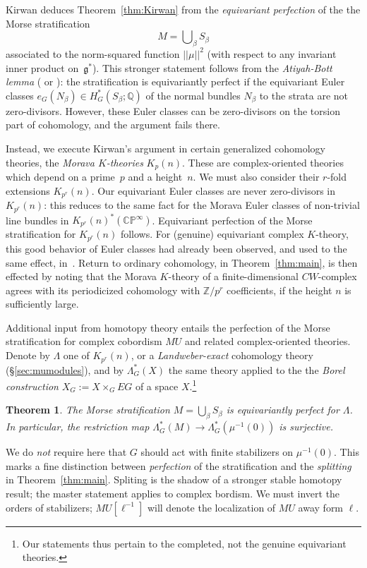 \documentclass[11pt, reqno]{amsart}
\theoremstyle{plain}
\newtheorem{thm}{Theorem}[section]
\theoremstyle{definition}
\newcommand{\landw}{\Lambda}
\begin{document}
Kirwan deduces Theorem~\ref{thm:Kirwan} from the \emph{equivariant perfection} of the the Morse stratification 
\[
M=\bigcup\nolimits_\beta S_\beta
\] 
associated to the norm-squared function $||\mu||^2$ (with respect to any invariant inner product on~$\mathfrak{g}^*$). 
This stronger statement follows from the \emph{Atiyah-Bott lemma} (\cite[Proposition 13.4]{AB} or 
\cite[Lemma 2.18]{Kirwan}): 
the stratification is equivariantly perfect if the equivariant Euler classes 
$e_G(N_\beta) \in H^*_G(S_\beta; \mathbb{Q})$ of the normal bundles $N_\beta$ to the strata are not zero-divisors. However, these Euler classes can be zero-divisors 
on the torsion part of cohomology, and the argument fails there.  

Instead, we execute Kirwan's argument in certain generalized cohomology theories, the \emph{Morava $K$-theories} 
$K_p(n)$. These are complex-oriented theories which depend on a prime~$p$ and a height~$n$.  We must also 
consider their $r$-fold extensions $K_{p^r}(n)$.  Our equivariant Euler classes are never zero-divisors in 
$K_{p^r}(n)$:   this reduces to the same fact for the Morava Euler classes of non-trivial line 
bundles in $K_{p^r}(n)^*\left(\mathbb{CP}^\infty\right)$.  
Equivariant perfection of the Morse stratification for $K_{p^r}(n)$ follows. For (genuine) 
equivariant complex $K$-theory, this good behavior of Euler classes had already been observed, and used 
to the same effect, in~\cite{Harada-Landweber}. 
Return to ordinary cohomology, in Theorem~\ref{thm:main}, is then effected by noting that the 
Morava $K$-theory of a finite-dimensional $CW$-complex agrees with its periodicized cohomology with 
$\mathbb{Z}/p^r$ coefficients, if the height $n$ is sufficiently large. 

Additional input from homotopy theory entails the perfection of the Morse stratification for 
complex cobordism $MU$ and related complex-oriented theories. Denote by $\landw$ one of 
$K_{p^r}(n)$, or a \emph{Landweber-exact} cohomology theory (\S\ref{sec:mumodules}), and by 
$\landw_G^*(X)$ the same theory applied to the the \emph{Borel construction} $X_G:=X\times_G EG$ 
of a space $X$.\footnote{Our statements thus pertain to the completed, not the genuine equivariant 
theories.} 
\begin{thm}  \label{thm:MoravaKirwan}  
The Morse stratification $M=\bigcup_\beta S_\beta$  is equivariantly perfect for $\landw$.  
In particular,  the  restriction map $\landw^*_G(M)\to  \landw^*_G(\mu^{-1}(0))$ is surjective. 
\end{thm} 
\noindent
We do \emph{not} require here that $G$ should act with finite stabilizers on $\mu^{-1}(0)$. This  
marks a fine distinction between \emph{perfection} of the stratification and the \emph{splitting} 
in Theorem~\ref{thm:main}. Spliting is the shadow of a stronger stable homotopy result; the master 
statement applies to complex bordism. We must invert the 
orders of stabilizers; $MU[\ell^{-1}]$ will denote the localization of $MU$ away form $\ell$. 
\end{document}

